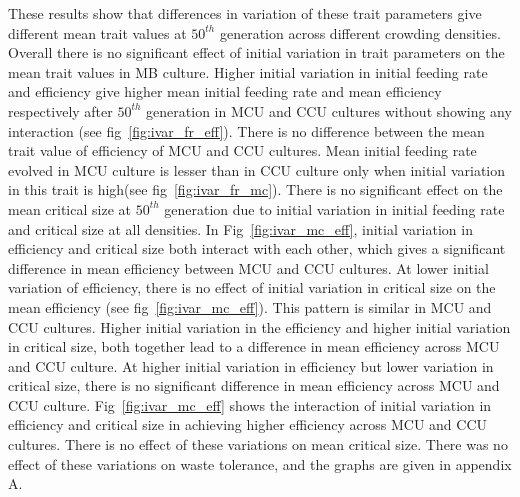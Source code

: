 These results show that differences in variation of these trait parameters give different mean trait values at $50^{th}$ generation across different crowding densities. Overall there is no significant effect of initial variation in trait parameters on the mean trait values in MB culture. Higher initial variation in initial feeding rate and efficiency give higher mean initial feeding rate and mean efficiency respectively after $50^{th}$ generation in MCU and CCU cultures without showing any interaction (see fig~\ref{fig:ivar_fr_eff}). There is no difference between the mean trait value of efficiency of MCU and CCU cultures. Mean initial feeding rate evolved in MCU culture is lesser than in CCU culture only when initial variation in this trait is high(see fig~\ref{fig:ivar_fr_mc}). There is no significant effect on the mean critical size at $50^{th}$ generation due to initial variation in initial feeding rate and critical size at all densities. In Fig~\ref{fig:ivar_mc_eff}, initial variation in efficiency and critical size both interact with each other, which gives a significant difference in mean efficiency between MCU and CCU cultures. At lower initial variation of efficiency, there is no effect of initial variation in critical size on the mean efficiency (see fig~\ref{fig:ivar_mc_eff}). This pattern is similar in MCU and CCU cultures. Higher initial variation in the efficiency and higher initial variation in critical size, both together lead to a difference in mean efficiency across MCU and CCU culture. At higher initial variation in efficiency but lower variation in critical size, there is no significant difference in mean efficiency across MCU and CCU culture. Fig~\ref{fig:ivar_mc_eff} shows the interaction of initial variation in efficiency and critical size in achieving higher efficiency across MCU and CCU cultures. There is no effect of these variations on mean critical size. There was no effect of these variations on waste tolerance, and the graphs are given in appendix A.
